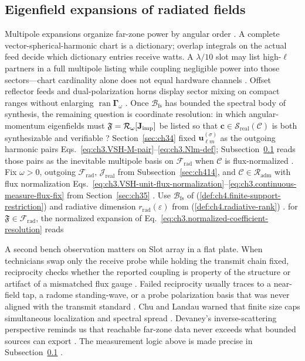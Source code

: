 \subsection{Eigenfield expansions of radiated fields}
\label{sec:ch451}
Multipole expansions organize far-zone power by angular order \cite{stratton1941}. A complete vector-spherical-harmonic chart is a dictionary; overlap integrals on the actual feed decide which dictionary entries receive watts. A $\lambda/10$ slot may list high-$\ell$ partners in a full multipole listing while coupling negligible power into those sectors---chart cardinality alone does not equal hardware channels \cite{chu1948}. Offset reflector feeds and dual-polarization horns display sector mixing on compact ranges without enlarging $\operatorname{ran}\boldsymbol{\Gamma}_\omega$ \cite{harrington2001}.
\medskip
Once \(\mathcal{B}_{\mathrm{fs}}\) has bounded the spectral body of synthesis, the remaining question is coordinate
resolution: in which angular-momentum eigenfields must \(\mathfrak{F}=\mathcal{R}_\omega[\mathbf{J}_{\mathrm{imp}}]\) be listed so that
\(\mathbf{c}\in\mathcal{S}_{\mathrm{real}}(\mathcal{C})\) is both synthesizable and verifiable
\cite{hansen1988}? Section~\ref{sec:ch34} fixed \(\mathbf{u}_{\ell m}^{(\sigma)}\) as the outgoing
harmonic pairs Eqs.~\eqref{eq:ch3.VSH-M-pair}--\eqref{eq:ch3.Nlm-def}; Subsection~\ref{sec:ch451} reads those pairs as
the inevitable multipole basis on \(\mathcal{F}_{\mathrm{rad}}\) when \(\mathcal{C}\) is flux-normalized
\cite{stratton1941}.
Fix \(\omega>0\), outgoing \(\mathcal{F}_{\mathrm{rad}}\), \(\mathcal{J}_{\mathrm{real}}\) from
Subsection~\ref{sec:ch414}, and \(\mathcal{C}\in\mathcal{R}_{\mathrm{adm}}\) with flux normalization
Eqs.~\eqref{eq:ch3.VSH-unit-flux-normalization}--\eqref{eq:ch3.continuous-measure-flux-fix} from
Section~\ref{sec:ch35} \cite{stratton1941}. Use \(\mathcal{B}_{\mathrm{fs}}\) of
(\ref{def:ch4.finite-support-restriction}) and radiative dimension \(r_{\mathrm{rad}}(\varepsilon)\) from
(\ref{def:ch4.radiative-rank}) \cite{harrington2001}.
for \(\mathfrak{F}\in\mathcal{F}_{\mathrm{rad}}\), the normalized expansion of
Eq.~\eqref{eq:ch3.normalized-coefficient-resolution} reads
\begin{physicalvignette}
A second bench observation matters on Slot array in a flat plate. When technicians swap only the receive probe while holding the transmit chain fixed, reciprocity checks whether the reported coupling is property of the structure or artifact of a mismatched flux gauge \cite{stratton1941}. Failed reciprocity usually traces to a near-field tap, a radome standing-wave, or a probe polarization basis that was never aligned with the transmit standard \cite{hansen1988}.
Chu and Landau warned that finite size caps simultaneous localization and spectral spread \cite{chu1948}. Devaney's inverse-scattering perspective reminds us that reachable far-zone data never exceeds what bounded sources can export \cite{devaney2004}.
The measurement logic above is made precise in Subsection~\ref{sec:ch451} \cite{stratton1941}.
\end{physicalvignette}
